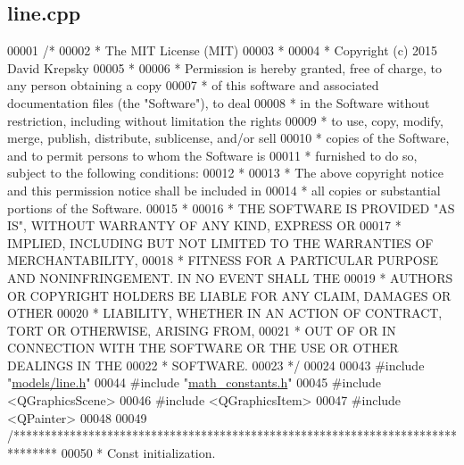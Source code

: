 \hypertarget{line_8cpp_source}{}\subsection{line.\+cpp}
\label{line_8cpp_source}

\begin{DoxyCode}
00001 \textcolor{comment}{/*}
00002 \textcolor{comment}{ * The MIT License (MIT)}
00003 \textcolor{comment}{ *}
00004 \textcolor{comment}{ * Copyright (c) 2015 David Krepsky}
00005 \textcolor{comment}{ *}
00006 \textcolor{comment}{ * Permission is hereby granted, free of charge, to any person obtaining a copy}
00007 \textcolor{comment}{ * of this software and associated documentation files (the "Software"), to deal}
00008 \textcolor{comment}{ * in the Software without restriction, including without limitation the rights}
00009 \textcolor{comment}{ * to use, copy, modify, merge, publish, distribute, sublicense, and/or sell}
00010 \textcolor{comment}{ * copies of the Software, and to permit persons to whom the Software is}
00011 \textcolor{comment}{ * furnished to do so, subject to the following conditions:}
00012 \textcolor{comment}{ *}
00013 \textcolor{comment}{ * The above copyright notice and this permission notice shall be included in}
00014 \textcolor{comment}{ * all copies or substantial portions of the Software.}
00015 \textcolor{comment}{ *}
00016 \textcolor{comment}{ * THE SOFTWARE IS PROVIDED "AS IS", WITHOUT WARRANTY OF ANY KIND, EXPRESS OR}
00017 \textcolor{comment}{ * IMPLIED, INCLUDING BUT NOT LIMITED TO THE WARRANTIES OF MERCHANTABILITY,}
00018 \textcolor{comment}{ * FITNESS FOR A PARTICULAR PURPOSE AND NONINFRINGEMENT. IN NO EVENT SHALL THE}
00019 \textcolor{comment}{ * AUTHORS OR COPYRIGHT HOLDERS BE LIABLE FOR ANY CLAIM, DAMAGES OR OTHER}
00020 \textcolor{comment}{ * LIABILITY, WHETHER IN AN ACTION OF CONTRACT, TORT OR OTHERWISE, ARISING FROM,}
00021 \textcolor{comment}{ * OUT OF OR IN CONNECTION WITH THE SOFTWARE OR THE USE OR OTHER DEALINGS IN THE}
00022 \textcolor{comment}{ * SOFTWARE.}
00023 \textcolor{comment}{ */}
00024 
00043 \textcolor{preprocessor}{#include "\hyperlink{line_8h}{models/line.h}"}
00044 \textcolor{preprocessor}{#include "\hyperlink{math__constants_8h}{math\_constants.h}"}
00045 \textcolor{preprocessor}{#include <QGraphicsScene>}
00046 \textcolor{preprocessor}{#include <QGraphicsItem>}
00047 \textcolor{preprocessor}{#include <QPainter>}
00048 
00049 \textcolor{comment}{/*******************************************************************************}
00050 \textcolor{comment}{ * Const initialization.}

\end{DoxyCode}
